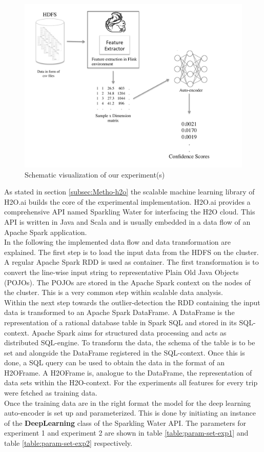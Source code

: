 \documentclass{vldb}
\begin{document}
\begin{figure}
\centering
\includegraphics[trim=1cm 0cm 1cm 0.5cm, clip=true, width=1.2\linewidth]{"pics/approach2"}
\caption{Schematic visualization of our experiment(s)}
\label{fig:approach-2}
\end{figure}

As stated in section \ref{subsec:Metho-h2o} the scalable machine learning library of H2O.ai builds the core of the experimental implementation. H2O.ai provides a comprehensive API named Sparkling Water for interfacing the H2O cloud. This API is written in Java and Scala and is usually embedded in a data flow of an Apache Spark application. \\
In the following the implemented data flow and data transformation are explained. The first step is to load the input data from the HDFS on the cluster. A regular Apache Spark RDD is used as container. The first transformation is to convert the line-wise input string to representative Plain Old Java Objects (POJOs). The POJOs are stored in the Apache Spark context on the nodes of the cluster. This is a very common step within scalable data analysis.\\
Within the next step towards the outlier-detection the RDD containing the input data is transformed to an Apache Spark DataFrame. A DataFrame is the representation of a rational database table in Spark SQL and stored in its SQL-context. Apache Spark aims for structured data processing and acts as distributed SQL-engine. To transform the data, the schema of the table is to be set and alongside the DataFrame registered in the SQL-context. Once this is done, a SQL query can be used to obtain the data in the format of an H2OFrame. A H2OFrame is, analogue to the DataFrame, the representation of data sets within the H2O-context. For the experiments all features for every trip were fetched as training data.\\
Once the training data are in the right format the model for the deep learning auto-encoder is set up and parameterized. This is done by initiating an instance of the \textbf{DeepLearning} class of the Sparkling Water API. The parameters for experiment 1 and experiment 2 are shown in table \ref{table:param-set-exp1} and table \ref{table:param-set-exp2} respectively.
\end{document}
